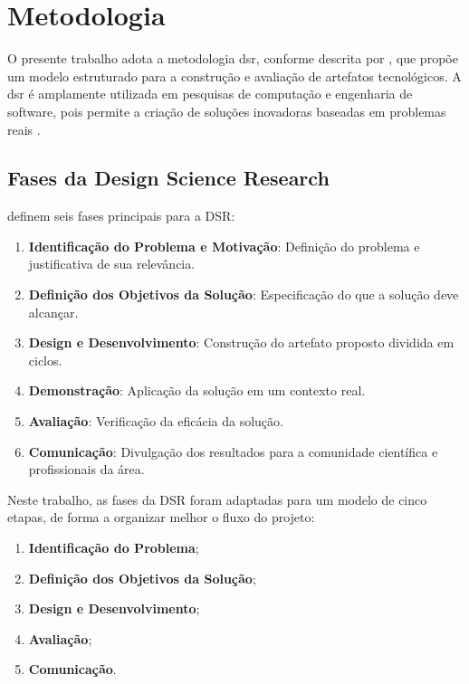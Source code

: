 \chapter{Metodologia}
\label{cap:metodologia}

O presente trabalho adota a metodologia \gls{dsr}, conforme descrita por \cite{peffers2007design}, que propõe um modelo estruturado para a construção e avaliação de artefatos tecnológicos. A \gls{dsr} é amplamente utilizada em pesquisas de computação e engenharia de software, pois permite a criação de soluções inovadoras baseadas em problemas reais \citep{horita2019design}.

\section{Fases da Design Science Research}

\cite{peffers2007design} definem seis fases principais para a DSR:

\begin{enumerate}
    \item \textbf{Identificação do Problema e Motivação}: Definição do problema e justificativa de sua relevância.
    \item \textbf{Definição dos Objetivos da Solução}: Especificação do que a solução deve alcançar.
    \item \textbf{Design e Desenvolvimento}: Construção do artefato proposto dividida em ciclos.
    \item \textbf{Demonstração}: Aplicação da solução em um contexto real.
    \item \textbf{Avaliação}: Verificação da eficácia da solução.
    \item \textbf{Comunicação}: Divulgação dos resultados para a comunidade científica e profissionais da área.
\end{enumerate}

Neste trabalho, as fases da DSR foram adaptadas para um modelo de cinco etapas, de forma a organizar melhor o fluxo do projeto:

\begin{enumerate}
    \item \textbf{Identificação do Problema};
    \item \textbf{Definição dos Objetivos da Solução};
    \item \textbf{Design e Desenvolvimento};
    \item \textbf{Avaliação};
    \item \textbf{Comunicação}.
\end{enumerate}

